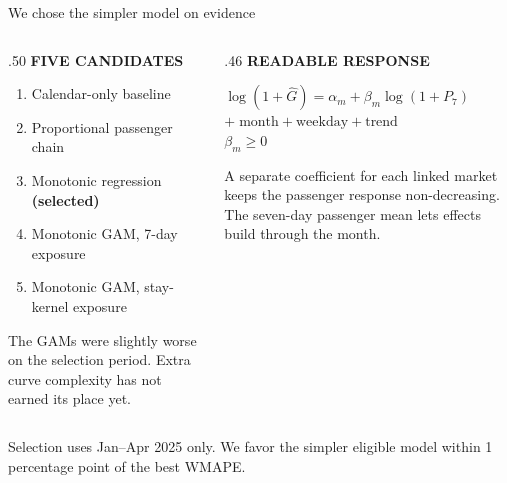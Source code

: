 \documentclass[aspectratio=169,10pt]{beamer}
\newcommand{\kicker}[1]{{\color{Accent}\scriptsize\bfseries\MakeUppercase{#1}}\par\vspace{.16cm}}
\newcommand{\smallnote}[1]{{\color{Muted}\scriptsize #1}}
\newcommand{\strong}[1]{{\bfseries #1}}
\begin{document}
\begin{frame}{We chose the simpler model on evidence}
  \begin{columns}[T,totalwidth=\linewidth]
    \begin{column}{.50\linewidth}
      \kicker{Five candidates}
      \begin{enumerate}\setlength\itemsep{.14cm}
        \item Calendar-only baseline
        \item Proportional passenger chain
        \item Monotonic regression \strong{(selected)}
        \item Monotonic GAM, 7-day exposure
        \item Monotonic GAM, stay-kernel exposure
      \end{enumerate}
      \vspace{.2cm}
      \smallnote{The GAMs were slightly worse on the selection period. Extra curve complexity has not earned its place yet.}
    \end{column}
    \begin{column}{.46\linewidth}
      \kicker{Readable response}
      \begin{center}
      \colorbox{Pale}{\parbox{.94\linewidth}{\centering\vspace{.15cm}
        $\log(1+\widehat{G})=\alpha_{m}+\beta_{m}\log(1+P_{7})$\\[.08cm]
        $+\;\text{month}+\text{weekday}+\text{trend}$\\[.08cm]
        $\beta_{m}\geq 0$\vspace{.15cm}}}
      \end{center}
      A separate coefficient for each linked market keeps the passenger response non-decreasing. The seven-day passenger mean lets effects build through the month.
    \end{column}
  \end{columns}
  \vfill
  \smallnote{Selection uses Jan--Apr 2025 only. We favor the simpler eligible model within 1 percentage point of the best WMAPE.}
\end{frame}
\end{document}
